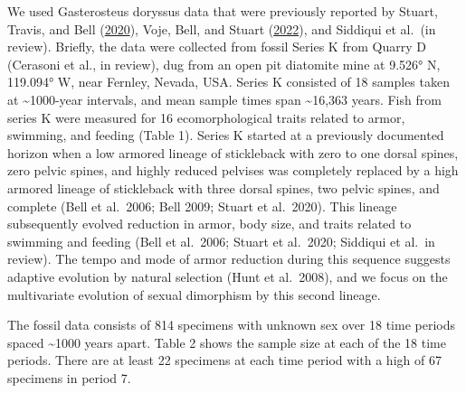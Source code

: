 \documentclass[
  12pt,
]{article}
\begin{document}
We used Gasterosteus doryssus data that were previously reported by
Stuart, Travis, and Bell (\protect\hyperlink{ref-Stuart2020}{2020}),
Voje, Bell, and Stuart (\protect\hyperlink{ref-Voje2022}{2022}), and
Siddiqui et al.~(in review). Briefly, the data were collected from
fossil Series K from Quarry D (Cerasoni et al., in review), dug from an
open pit diatomite mine at 9.526° N, 119.094° W, near Fernley, Nevada,
USA. Series K consisted of 18 samples taken at \textasciitilde1000-year
intervals, and mean sample times span \textasciitilde16,363 years. Fish
from series K were measured for 16 ecomorphological traits related to
armor, swimming, and feeding (Table 1). Series K started at a previously
documented horizon when a low armored lineage of stickleback with zero
to one dorsal spines, zero pelvic spines, and highly reduced pelvises
was completely replaced by a high armored lineage of stickleback with
three dorsal spines, two pelvic spines, and complete (Bell et al.~2006;
Bell 2009; Stuart et al.~2020). This lineage subsequently evolved
reduction in armor, body size, and traits related to swimming and
feeding (Bell et al.~2006; Stuart et al.~2020; Siddiqui et al.~in
review). The tempo and mode of armor reduction during this sequence
suggests adaptive evolution by natural selection (Hunt et al.~2008), and
we focus on the multivariate evolution of sexual dimorphism by this
second lineage.

The fossil data consists of 814 specimens with unknown sex over 18 time
periods spaced \textasciitilde1000 years apart. Table 2 shows the sample
size at each of the 18 time periods. There are at least 22 specimens at
each time period with a high of 67 specimens in period 7.
\end{document}
